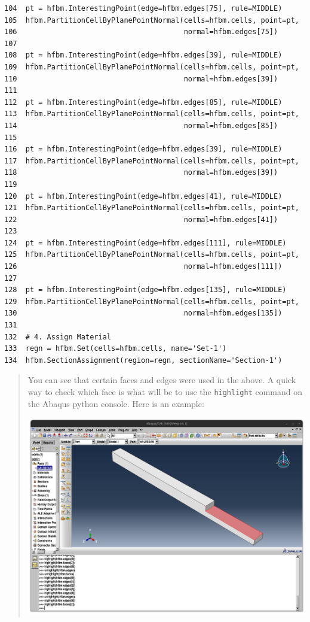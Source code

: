 \documentclass[11pt]{article}
\begin{document}
\begin{enumerate}
\begin{verbatim}
104  pt = hfbm.InterestingPoint(edge=hfbm.edges[75], rule=MIDDLE)
105  hfbm.PartitionCellByPlanePointNormal(cells=hfbm.cells, point=pt,
106                                       normal=hfbm.edges[75])
107  
108  pt = hfbm.InterestingPoint(edge=hfbm.edges[39], rule=MIDDLE)
109  hfbm.PartitionCellByPlanePointNormal(cells=hfbm.cells, point=pt,
110                                       normal=hfbm.edges[39])
111  
112  pt = hfbm.InterestingPoint(edge=hfbm.edges[85], rule=MIDDLE)
113  hfbm.PartitionCellByPlanePointNormal(cells=hfbm.cells, point=pt,
114                                       normal=hfbm.edges[85])
115  
116  pt = hfbm.InterestingPoint(edge=hfbm.edges[39], rule=MIDDLE)
117  hfbm.PartitionCellByPlanePointNormal(cells=hfbm.cells, point=pt,
118                                       normal=hfbm.edges[39])
119  
120  pt = hfbm.InterestingPoint(edge=hfbm.edges[41], rule=MIDDLE)
121  hfbm.PartitionCellByPlanePointNormal(cells=hfbm.cells, point=pt,
122                                       normal=hfbm.edges[41])
123  
124  pt = hfbm.InterestingPoint(edge=hfbm.edges[111], rule=MIDDLE)
125  hfbm.PartitionCellByPlanePointNormal(cells=hfbm.cells, point=pt,
126                                       normal=hfbm.edges[111])
127  
128  pt = hfbm.InterestingPoint(edge=hfbm.edges[135], rule=MIDDLE)
129  hfbm.PartitionCellByPlanePointNormal(cells=hfbm.cells, point=pt,
130                                       normal=hfbm.edges[135])
131  
132  # 4. Assign Material
133  regn = hfbm.Set(cells=hfbm.cells, name='Set-1')
134  hfbm.SectionAssignment(region=regn, sectionName='Section-1')
\end{verbatim}
\end{enumerate}
\begin{quote}
                              \begin{tcolorbox}[colback=osbe-bg,colframe=osbe-fg,title={Scripting note},sharp corners,boxrule=0.4pt]
You can see that certain faces and edges were used in the above.
A quick way to check which face is what will be to use the \texttt{highlight} command on the Abaqus python console.
Here is an example:
\begin{center}
\includegraphics[width=.9\linewidth]{./figs/highl.png}
\end{center}


               \end{tcolorbox}
\end{quote}
\end{document}
